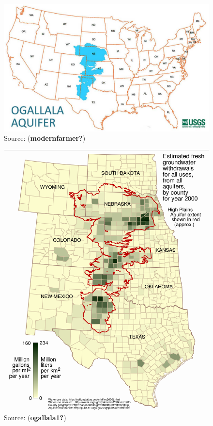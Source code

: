 \documentclass[
  letterpaper,
  DIV=11,
  numbers=noendperiod]{scrreprt}
\begin{document}
\begin{figure}

{\centering \includegraphics{archive/figures/ogallala_aquifer_usgs.jpg}

}

\caption{Source: (\textbf{modernfarmer?})}

\end{figure}

\begin{figure}

{\centering \includegraphics{archive/figures/ogallala_aquifer_wiki.png}

}

\caption{Source: (\textbf{ogallala1?})}

\end{figure}
\end{document}
